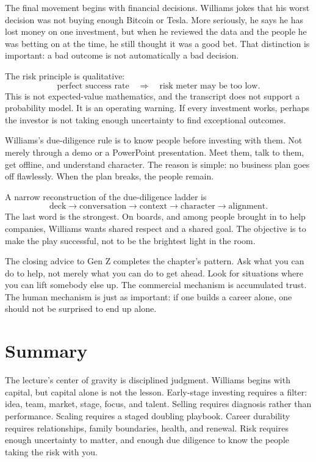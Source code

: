 The final movement begins with financial decisions. Williams jokes that his worst decision was not buying enough Bitcoin or Tesla. More seriously, he says he has lost money on one investment, but when he reviewed the data and the people he was betting on at the time, he still thought it was a good bet. That distinction is important: a bad outcome is not automatically a bad decision.

The risk principle is qualitative:
\begin{equation}
\text{perfect success rate}
\quad\Rightarrow\quad
\text{risk meter may be too low}.
\end{equation}
This is not expected-value mathematics, and the transcript does not support a probability model. It is an operating warning. If every investment works, perhaps the investor is not taking enough uncertainty to find exceptional outcomes.

Williams's due-diligence rule is to know people before investing with them. Not merely through a demo or a PowerPoint presentation. Meet them, talk to them, get offline, and understand character. The reason is simple: no business plan goes off flawlessly. When the plan breaks, the people remain.

A narrow reconstruction of the due-diligence ladder is
\begin{equation}
\text{deck}
\longrightarrow
\text{conversation}
\longrightarrow
\text{context}
\longrightarrow
\text{character}
\longrightarrow
\text{alignment}.
\end{equation}
The last word is the strongest. On boards, and among people brought in to help companies, Williams wants shared respect and a shared goal. The objective is to make the play successful, not to be the brightest light in the room.

The closing advice to Gen Z completes the chapter's pattern. Ask what you can do to help, not merely what you can do to get ahead. Look for situations where you can lift somebody else up. The commercial mechanism is accumulated trust. The human mechanism is just as important: if one builds a career alone, one should not be surprised to end up alone.

\section{Summary}

The lecture's center of gravity is disciplined judgment. Williams begins with capital, but capital alone is not the lesson. Early-stage investing requires a filter: idea, team, market, stage, focus, and talent. Selling requires diagnosis rather than performance. Scaling requires a staged doubling playbook. Career durability requires relationships, family boundaries, health, and renewal. Risk requires enough uncertainty to matter, and enough due diligence to know the people taking the risk with you.

